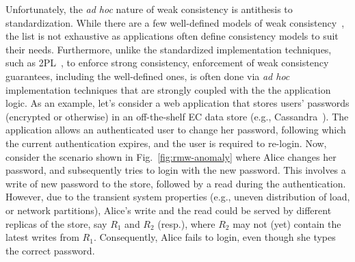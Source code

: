 Unfortunately, the \emph{ad hoc} nature of weak consistency is
antithesis to standardization. While there are a few well-defined
models of weak consistency~\cite{terry-pdis94}, the list is not
exhaustive as applications often define consistency models to suit
their needs. Furthermore, unlike the standardized implementation
techniques, such as 2PL~\cite{2pl}, to enforce strong consistency,
enforcement of weak consistency guarantees, including the well-defined
ones, is often done via \emph{ad hoc} implementation techniques that
are strongly coupled with the the application logic. 
As an example, let's consider a web application that stores users'
passwords (encrypted or otherwise) in an off-the-shelf EC data store
(e.g., Cassandra~\cite{cassandra}). The application allows an
authenticated user to change her password, following which the current
authentication expires, and the user is required to re-login. Now,
consider the scenario shown in Fig.~\ref{fig:rmw-anomaly} where Alice
changes her password, and subsequently tries to login with the new
password. This involves a write of new password to the store, followed
by a read during the authentication.  However, due to the transient
system properties (e.g., uneven distribution of load, or network
partitions), Alice's write and the read could be served by different
replicas of the store, say $R_1$ and $R_2$ (resp.), where $R_2$ may
not (yet) contain the latest writes from $R_1$. Consequently, Alice
fails to login, even though she types the correct password.

